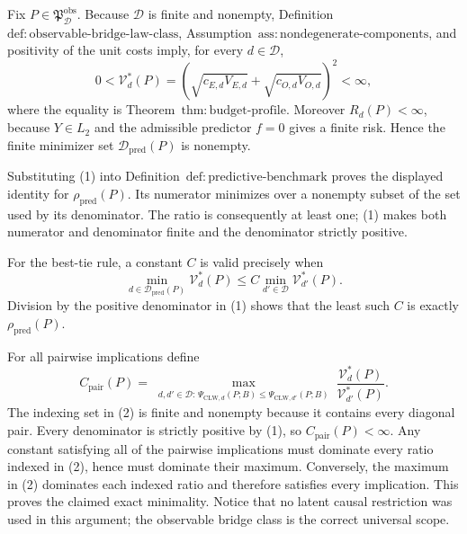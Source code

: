 Fix \(P\in\mathfrak P_{\mathcal D}^{\mathrm{obs}}\).  Because \(\mathcal D\) is finite and nonempty, Definition~\(\mathrm{def{:}observable\text{-}bridge\text{-}law\text{-}class}\), Assumption~\(\mathrm{ass{:}nondegenerate\text{-}components}\), and positivity of the unit costs imply, for every \(d\in\mathcal D\),
\[
 0<\mathcal V_d^*(P)
 =\left(\sqrt{c_{E,d}V_{E,d}}+
          \sqrt{c_{O,d}V_{O,d}}\right)^2<\infty,                 \tag{1}
\]
where the equality is Theorem~\(\mathrm{thm{:}budget\text{-}profile}\).  Moreover \(R_d(P)<\infty\), because \(Y\in L_2\) and the admissible predictor \(f=0\) gives a finite risk.  Hence the finite minimizer set \(\mathcal D_{\mathrm{pred}}(P)\) is nonempty.

Substituting (1) into Definition~\(\mathrm{def{:}predictive\text{-}benchmark}\) proves the displayed identity for \(\rho_{\mathrm{pred}}(P)\).  Its numerator minimizes over a nonempty subset of the set used by its denominator.  The ratio is consequently at least one; (1) makes both numerator and denominator finite and the denominator strictly positive.

For the best-tie rule, a constant \(C\) is valid precisely when
\[
 \min_{d\in\mathcal D_{\mathrm{pred}}(P)}\mathcal V_d^*(P)
 \le C\min_{d'\in\mathcal D}\mathcal V_{d'}^*(P).
\]
Division by the positive denominator in (1) shows that the least such \(C\) is exactly \(\rho_{\mathrm{pred}}(P)\).

For all pairwise implications define
\[
 C_{\mathrm{pair}}(P)=
 \max_{\substack{d,d'\in\mathcal D:\,
 \Psi_{\mathrm{CLW},d}(P;B)\le
 \Psi_{\mathrm{CLW},d'}(P;B)}}
 \frac{\mathcal V_d^*(P)}{\mathcal V_{d'}^*(P)}.                \tag{2}
\]
The indexing set in (2) is finite and nonempty because it contains every diagonal pair.  Every denominator is strictly positive by (1), so \(C_{\mathrm{pair}}(P)<\infty\).  Any constant satisfying all of the pairwise implications must dominate every ratio indexed in (2), hence must dominate their maximum.  Conversely, the maximum in (2) dominates each indexed ratio and therefore satisfies every implication.  This proves the claimed exact minimality.  Notice that no latent causal restriction was used in this argument; the observable bridge class is the correct universal scope.

